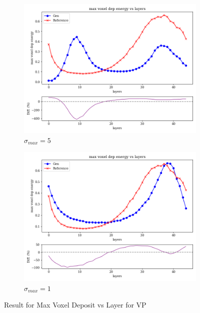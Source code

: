 \begin{figure}
\begin{subfigure}[b]{0.23\textwidth}
        \centering
        \includegraphics[width=\textwidth]{Figures/vp5_5.png}
        \caption{$\sigma_{max}=5$}
        \label{fig:vp5_5}
    \end{subfigure}
    \hfill
    \begin{subfigure}[b]{0.23\textwidth}  %
        \centering
        \includegraphics[width=\textwidth]{Figures/vp1_5.png}
        \caption{$\sigma_{max}=1$}
        \label{fig:vp1_5}
    \end{subfigure}
    \caption{Result for Max Voxel Deposit vs Layer for VP}
\end{figure}

